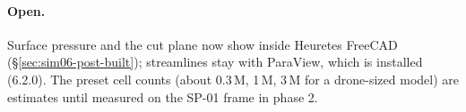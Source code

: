 \paragraph{Open.} Surface pressure and the cut plane now show inside Heuretes FreeCAD (\S\ref{sec:sim06-post-built}); streamlines
stay with ParaView, which is installed (6.2.0). The preset cell counts
(about 0.3\,M, 1\,M, 3\,M for a drone-sized model) are estimates until measured on the SP-01 frame in phase 2.
